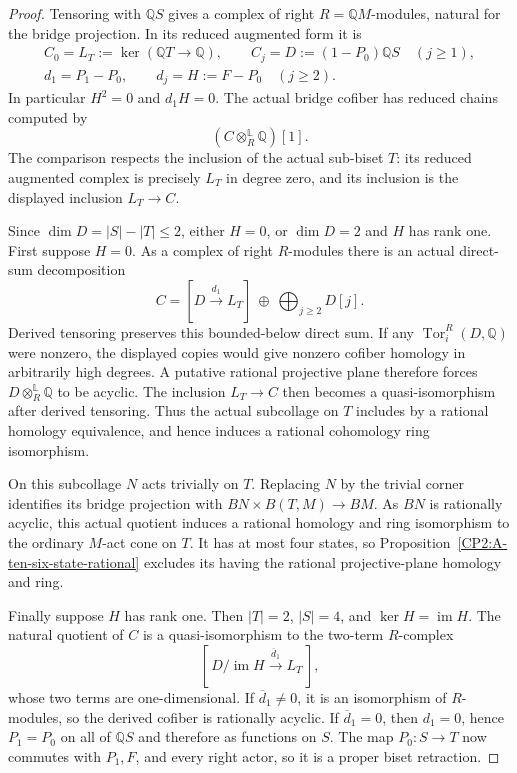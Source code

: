 \begin{proof}
Tensoring with $\mathbb QS$ gives a complex of right
$R=\mathbb QM$-modules, natural for the bridge projection.
In its reduced augmented form it is
\[
 \begin{gathered}
 C_0=L_T:=\ker(\mathbb QT\to\mathbb Q),\qquad
 C_j=D:=(1-P_0)\mathbb QS\quad(j\geq1),\\
 d_1=P_1-P_0,\qquad d_j=H:=F-P_0\quad(j\geq2).
 \end{gathered}
\]
In particular $H^2=0$ and $d_1H=0$.  The actual bridge cofiber has
reduced chains computed by
\[
 (C\otimes_R^{\mathbb L}\mathbb Q)[1].
\]
The comparison respects the inclusion of the actual sub-biset $T$:
its reduced augmented complex is precisely $L_T$ in degree zero,
and its inclusion is the displayed inclusion $L_T\to C$.

Since $\dim D=|S|-|T|\leq2$, either $H=0$, or $\dim D=2$ and
$H$ has rank one.  First suppose $H=0$.  As a complex of right
$R$-modules there is an actual direct-sum decomposition
\[
 C=[D\xrightarrow{d_1}L_T]\ \oplus\
       \bigoplus_{j\geq2}D[j].
\]
Derived tensoring preserves this bounded-below direct sum.  If any
$\operatorname{Tor}^R_i(D,\mathbb Q)$ were nonzero, the displayed
copies would give nonzero cofiber homology in arbitrarily high
degrees.  A putative rational projective plane therefore forces
$D\otimes_R^{\mathbb L}\mathbb Q$ to be acyclic.  The inclusion
$L_T\to C$ then becomes a quasi-isomorphism after derived tensoring.
Thus the actual subcollage on $T$ includes by a rational homology
equivalence, and hence induces a rational cohomology ring isomorphism.

On this subcollage $N$ acts trivially on $T$.  Replacing $N$ by the
trivial corner identifies its bridge projection with
$BN\times B(T,M)\to BM$.  As $BN$ is rationally acyclic, this
actual quotient induces a rational homology and ring isomorphism to
the ordinary $M$-act cone on $T$.  It has at most four states, so
Proposition~\ref{CP2:A-ten-six-state-rational} excludes its having
the rational projective-plane homology and ring.

Finally suppose $H$ has rank one.  Then $|T|=2$, $|S|=4$, and
$\ker H=\operatorname{im}H$.  The natural quotient of $C$ is a
quasi-isomorphism to the two-term $R$-complex
\[
 [\,D/\operatorname{im}H\xrightarrow{\overline d_1}L_T\,],
\]
whose two terms are one-dimensional.  If $\overline d_1\ne0$,
it is an isomorphism of $R$-modules, so the derived cofiber is
rationally acyclic.  If $\overline d_1=0$, then $d_1=0$, hence
$P_1=P_0$ on all of $\mathbb QS$ and therefore as functions on $S$.
The map $P_0:S\to T$ now commutes with $P_1,F$, and every right
actor, so it is a proper biset retraction.


\end{proof}

